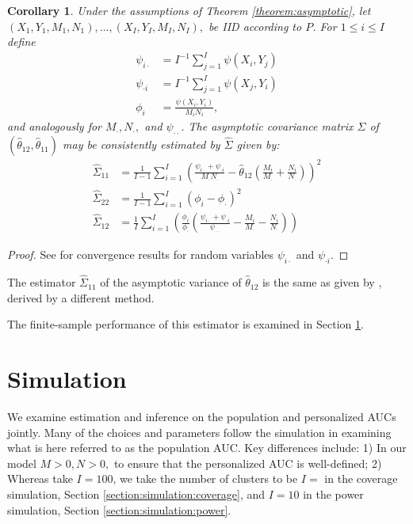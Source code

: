 \documentclass[12pt]{article}
\DeclareMathOperator{\AUC}{AUC}
\newcommand{\I}{I}
\renewcommand{\P}{P}
\newcommand{\cind}{\perp \!\!\! \perp}
\newcommand{\aucindivhat}{\hat{\theta}_{11}}%
\newcommand{\aucpophat}{\hat{\theta}_{12}}%
\newcommand{\kernel}{\psi}
\newcommand{\Kernel}{\psi}
\renewcommand{\d}{\phi}
\newtheorem{corollary}[theorem]{Corollary}
\begin{document}
\begin{corollary}\label{corollary:variance estimator}
  Under the assumptions of Theorem \ref{theorem:asymptotic}, let
  $(X_1,Y_1,M_1,N_1),\ldots,(X_\I,Y_\I,M_\I,N_\I),$ be IID according
  to $\P$. For $1\le i\le \I$ define
  \begin{align}
    \kernel_{i\cdot}&=I^{-1}\sum_{j=1}^\I \kernel(X_i,Y_j)\\
    \kernel_{\cdot i}&=I^{-1}\sum_{j=1}^\I \kernel(X_j,Y_i)\\
    \phi_i &= \frac{\kernel(X_i,Y_i)}{M_iN_i},
  \end{align}
  and analogously for $M_\cdot,N_\cdot,$ and $\kernel_{\cdot\cdot}$. The asymptotic covariance matrix
  $\Sigma$ of $(\aucpophat,\aucindivhat)$ may be consistently
  estimated by $\hat{\Sigma}$ given by:
  \begin{align}
    \hat{\Sigma}_{11} &=\frac{1}{\I-1}\sum_{i=1}^\I\left( \frac{\Kernel_{i\cdot}+\Kernel_{\cdot i}}{M_\cdot N_\cdot}-\aucpophat\left(\frac{M_i}{M_\cdot}+\frac{N_i}{N_\cdot}\right) \right)^2\\
    \hat{\Sigma}_{22} &= \frac{1}{\I-1}\sum_{i=1}^\I(\d_i-\d_\cdot)^2\\
    \hat{\Sigma}_{12} &=\frac{1}{\I}\sum_{i=1}^\I\left(\frac{\d_{i}}{\d_{\cdot}}\left(\frac{\Kernel_{i\cdot}+\Kernel_{\cdot i}}{\Kernel_{\cdot\cdot}} - \frac{M_i}{M_\cdot}-\frac{N_i}{N_\cdot}   \right) \right) %
  \end{align}
\end{corollary}
\begin{proof}
  See \cite{sen1960} for convergence results for random variables $\Kernel_{i\cdot}$ and $\Kernel_{\cdot i}.$ 
\end{proof}
The estimator $\hat{\Sigma}_{11}$ of the asymptotic variance of $\aucpophat$ is the same as given by \cite{obuchowski1997}, derived by a different method.

The finite-sample performance of this estimator is examined in Section \ref{section:simulation}.



\section{Simulation}\label{section:simulation}

We examine estimation and inference on the population and personalized
AUCs jointly. Many of the choices and parameters follow the simulation
in \cite{obuchowski1997} examining what is here referred to as the
population AUC. Key differences include: 1) In our model 
$M>0,N>0,$ to ensure that the personalized AUC is well-defined; 2) Whereas
\cite{obuchowski1997} take $\I=100$, we take the number of clusters to be $\I=$ in the coverage simulation, Section \ref{section:simulation:coverage}, and $\I=10$ in the power simulation, Section \ref{section:simulation:power}.
\end{document}
